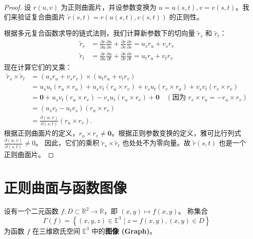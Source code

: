 \documentclass[lang=cn,10pt,thmcnt=section]{elegantbook}
\renewcommand{\vec}[1]{\mathbf{#1}}
\begin{document}
\begin{proof}
    设 $r(u,v)$ 为正则曲面片，并设参数变换为 $u = u(s, t), v = v(s, t)$。我们来验证复合曲面片 $\tilde{r}(s,t) = r(u(s,t), v(s,t))$ 的正则性。
    
    根据多元复合函数求导的链式法则，我们计算新参数下的切向量 $\tilde{r}_s$ 和 $\tilde{r}_t$：
    \begin{align*}
    \tilde{r}_s &= \frac{\partial r}{\partial u}\frac{\partial u}{\partial s} + \frac{\partial r}{\partial v}\frac{\partial v}{\partial s} = u_s r_u + v_s r_v \\
    \tilde{r}_t &= \frac{\partial r}{\partial u}\frac{\partial u}{\partial t} + \frac{\partial r}{\partial v}\frac{\partial v}{\partial t} = u_t r_u + v_t r_v
    \end{align*}
    现在计算它们的叉乘：
    \begin{align*}
        \tilde{r}_s \times \tilde{r}_t &= (u_s r_u + v_s r_v) \times (u_t r_u + v_t r_v) \\
        &= u_s u_t (r_u \times r_u) + u_s v_t (r_u \times r_v) + v_s u_t (r_v \times r_u) + v_s v_t (r_v \times r_v) \\
        &= \vec{0} + u_s v_t (r_u \times r_v) - v_s u_t (r_u \times r_v) + \vec{0} \quad (\text{因为 } r_v \times r_u = -r_u \times r_v) \\
        &= (u_s v_t - u_t v_s) (r_u \times r_v) \\
        &= \frac{\partial (u,v)}{\partial (s,t)} (r_u \times r_v).
    \end{align*}
    根据正则曲面片的定义，$r_u \times r_v \neq \vec{0}$。根据正则参数变换的定义，雅可比行列式 $\frac{\partial (u,v)}{\partial (s,t)} \neq 0$。
    因此，它们的乘积 $\tilde{r}_s \times \tilde{r}_t$ 也处处不为零向量。故 $\tilde{r}(s,t)$ 也是一个正则曲面片。
\end{proof}

\section{正则曲面与函数图像}

\begin{definition}[函数的图像]
    设有一个二元函数 $f: D \subset \mathbb{R}^2 \to \mathbb{R}$，即 $(x, y) \mapsto f(x, y)$。
    称集合
    \[
    \Gamma(f) = \left\{ (x, y, z) \in \mathbb{E}^3 \mid z = f(x, y), (x, y) \in D \right\}
    \]
    为函数 $f$ 在三维欧氏空间 $\mathbb{E}^3$ 中的\textbf{图像 (Graph)}。
\end{definition}
\end{document}
